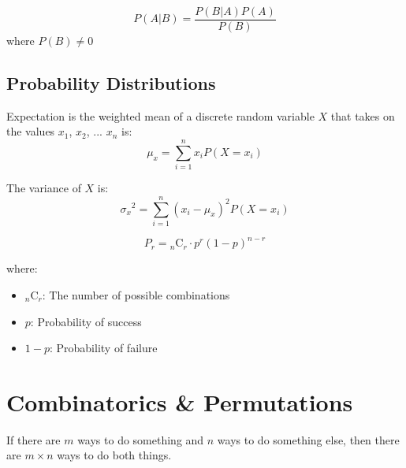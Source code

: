 \documentclass[11pt]{article}
\newcommand{\comb}[2]{{}_{#1}\mathrm{C}_{#2}}
\begin{document}
\begin{definition}\label{def:bayes-thm}
    \begin{equation*}
        P(A | B) = \frac{P(B | A) P(A)}{P(B)}
    \end{equation*}
    where $P(B) \neq 0$
\end{definition}

\subsection{Probability Distributions}

\begin{definition}[Expectation]\label{def:expectation}
    Expectation is the weighted mean of a discrete random variable $X$
    that takes on the values $x_1$, $x_2$, ... $x_n$ is:
    \begin{equation*}
        \mu_x = \sum_{i = 1}^n x_i P(X = x_i)
    \end{equation*}

    The variance of $X$ is:
    \begin{equation*}
        {\sigma_x}^2 = \sum_{i = 1}^n (x_i - \mu_x)^2 P(X = x_i)
    \end{equation*}
\end{definition}

\begin{definition}\label{def:binom-prob}
    \begin{equation*}
        P_r = \comb{n}{r} \cdot p^r (1 - p)^{n-r}
    \end{equation*}

    where:

    \begin{itemize}
        \item $\comb{n}{r}$: The number of possible combinations
        \item $p$: Probability of success
        \item $1 - p$: Probability of failure
    \end{itemize}
\end{definition}

\section{Combinatorics \& Permutations}

\begin{definition}\label{def:fund-count-principle}
    If there are $m$ ways to do something and $n$ ways to do something else, then there are
    $m \times n$ ways to do both things.
\end{definition}
\end{document}
